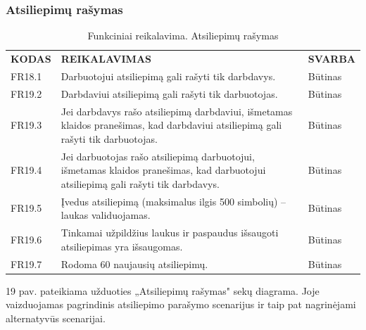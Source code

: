 \documentclass{VUMIFPSkursinis}
\begin{document}
\subsubsection{Atsiliepimų rašymas}
\begin{table}[H]
\caption{Funkciniai reikalavima. Atsiliepimų rašymas}
\centering
\normalsize
\begin{tabular}{|p{2cm}|p{10cm}|p{3cm}|}
\hline
\rowcolor{gray!30}
\multicolumn{3}{|l|}{\textbf{19. Atsiliepimų rašymas}} \\ \hline
\textbf{KODAS}& \multicolumn{1}{m{10cm}|}{\textbf{REIKALAVIMAS}} & \textbf{SVARBA} \\ \hline
FR18.1 & \multicolumn{1}{m{10cm}|}{Darbuotojui atsiliepimą gali rašyti tik darbdavys.} & Būtinas \\ \hline
FR19.2 & \multicolumn{1}{m{10cm}|}{Darbdaviui atsiliepimą gali rašyti tik darbuotojas.} & Būtinas \\ \hline
FR19.3 & \multicolumn{1}{m{10cm}|}{Jei darbdavys rašo atsiliepimą darbdaviui, išmetamas klaidos pranešimas, kad darbdaviui atsiliepimą gali rašyti tik darbuotojas.} & Būtinas \\ \hline
FR19.4 & \multicolumn{1}{m{10cm}|}{Jei darbuotojas rašo atsiliepimą darbuotojui, išmetamas klaidos pranešimas, kad darbuotojui atsiliepimą gali rašyti tik darbdavys.} & Būtinas \\ \hline
FR19.5 & \multicolumn{1}{m{10cm}|}{Įvedus atsiliepimą (maksimalus ilgis 500 simbolių) – laukas validuojamas.} & Būtinas \\ \hline
FR19.6 & \multicolumn{1}{m{10cm}|}{Tinkamai užpildžius laukus ir paspaudus išsaugoti atsiliepimas yra išsaugomas.} & Būtinas \\ \hline
FR19.7 & \multicolumn{1}{m{10cm}|}{Rodoma 60 naujausių atsiliepimų.} & Būtinas \\ \hline
\end{tabular}
\end{table}
19 pav. pateikiama užduoties „Atsiliepimų rašymas" sekų diagrama. Joje vaizduojamas pagrindinis atsiliepimo parašymo scenarijus ir taip pat nagrinėjami alternatyvūs scenarijai.
\end{document}
